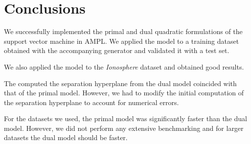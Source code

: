 










\chapter*{Conclusions}
We successfully implemented the primal and dual quadratic formulations of the support vector machine in AMPL.
We applied the model to a training dataset obtained with the accompanying generator and validated
it with a test set.

We also applied the model to the \emph{Ionosphere} dataset and obtained good results.

The computed the separation hyperplane from the dual model coincided with that of the primal model.
However, we had to modify the initial computation of the separation hyperplane to account
for numerical errors.

For the datasets we used, the primal model was significantly faster than the dual model. However,
we did not perform any extensive benchmarking and for larger datasets the dual model should be faster.


\nocite{*}

\printbibliography


